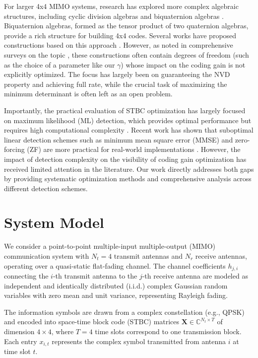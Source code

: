 \documentclass[twocolumn,conference]{IEEEtran}
\begin{document}
For larger 4x4 MIMO systems, research has explored more complex algebraic structures, including cyclic division algebras and biquaternion algebras \cite{7}. 
Biquaternion algebras, formed as the tensor product of two quaternion algebras, provide a rich structure for building 4x4 codes. 
Several works have proposed constructions based on this approach \cite{8,9}. 
However, as noted in comprehensive surveys on the topic \cite{10}, these constructions often contain degrees of freedom (such as the choice of a parameter like our $\gamma$) whose impact on the coding gain is not explicitly optimized. 
The focus has largely been on guaranteeing the NVD property and achieving full rate, while the crucial task of maximizing the minimum determinant is often left as an open problem.

Importantly, the practical evaluation of STBC optimization has largely focused on maximum likelihood (ML) detection, which provides optimal performance but requires high computational complexity \cite{11,12}. 
Recent work has shown that suboptimal linear detection schemes such as minimum mean square error (MMSE) and zero-forcing (ZF) are more practical for real-world implementations \cite{13,14}. 
However, the impact of detection complexity on the visibility of coding gain optimization has received limited attention in the literature. 
Our work directly addresses both gaps by providing systematic optimization methods and comprehensive analysis across different detection schemes.


\section{System Model}

We consider a point-to-point multiple-input multiple-output (MIMO) communication system with $N_t = 4$ transmit antennas and $N_r$ receive antennas, operating over a quasi-static flat-fading channel. 
The channel coefficients $h_{j,i}$ connecting the $i$-th transmit antenna to the $j$-th receive antenna are modeled as independent and identically distributed (i.i.d.) complex Gaussian random variables with zero mean and unit variance, representing Rayleigh fading.

The information symbols are drawn from a complex constellation (e.g., QPSK) and encoded into space-time block code (STBC) matrices $\mathbf{X} \in \mathbb{C}^{N_t \times T}$ of dimension $4 \times 4$, where $T = 4$ time slots correspond to one transmission block. 
Each entry $x_{i,t}$ represents the complex symbol transmitted from antenna $i$ at time slot $t$.
\end{document}

